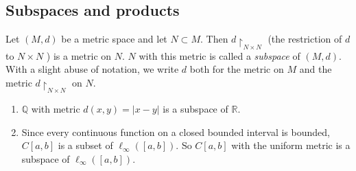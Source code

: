 \documentclass[a4paper,11pt]{article}
\begin{document}
\subsection{Subspaces and products}
\begin{definition}[Subspaces]
    Let $(M, d)$ be a metric space and let $N \subset M$. Then $d\upharpoonright_{N \times N}$ (the restriction of $d$ to $N \times N$ ) is a metric on $N$. $N$ with this metric is called a \textit{subspace} of $(M, d)$. With a slight abuse of notation, we write $d$ both for the metric on $M$ and the metric $d \upharpoonright _{N \times N}$ on $N$.
\end{definition}
\begin{example}
    \begin{enumerate}
        \item $\mathbb{Q}$ with metric $d(x, y)=|x-y|$ is a subspace of $\mathbb{R}$.
        \item Since every continuous function on a closed bounded interval is bounded, $C[a, b]$ is a subset of $\ell_{\infty}([a, b])$. So $C[a, b]$ with the uniform metric is a subspace of $\ell_{\infty}([a, b])$.
    \end{enumerate}
\end{example}
\end{document}
